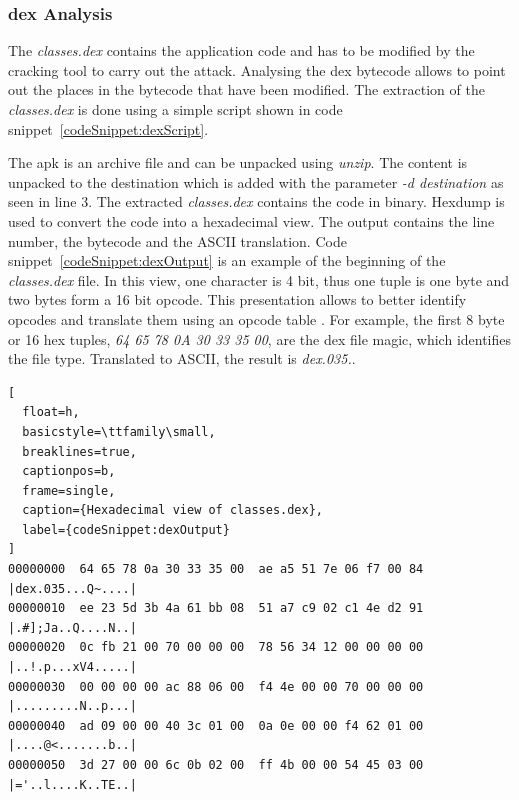 \subsubsection{dex Analysis} \label{subsection:tools-dex}
The \textit{classes.dex} contains the application code and has to be modified by the cracking tool to carry out the attack.
Analysing the dex bytecode allows to point out the places in the bytecode that have been modified.
\newline
The extraction of the \textit{classes.dex} is done using a simple script shown in code snippet~\ref{codeSnippet:dexScript}.
\newline

The \gls{apk} is an archive file and can be unpacked using \textit{unzip}.
The content is unpacked to the destination which is added with the parameter \textit{-d destination} as seen in line 3.
The extracted \textit{classes.dex} contains the code in binary.
Hexdump is used to convert the code into a hexadecimal view.
\newline
The output contains the line number, the bytecode and the ASCII translation.
Code snippet~\ref{codeSnippet:dexOutput} is an example of the beginning of the \textit{classes.dex} file.
In this view, one character is 4 bit, thus one tuple is one byte and two bytes form a 16 bit opcode.
This presentation allows to better identify opcodes and translate them using an opcode table \cite{opcodes}.
For example, the first 8 byte or 16 hex tuples, \textit{64 65 78 0A 30 33 35 00}, are the \gls{dex} file magic, which identifies the file type.
Translated to ASCII, the result is \textit{dex.035.}.
\begin{lstlisting}[
  float=h,
  basicstyle=\ttfamily\small,
  breaklines=true,
  captionpos=b,
  frame=single,
  caption={Hexadecimal view of classes.dex},
  label={codeSnippet:dexOutput}
]
00000000  64 65 78 0a 30 33 35 00  ae a5 51 7e 06 f7 00 84  |dex.035...Q~....|
00000010  ee 23 5d 3b 4a 61 bb 08  51 a7 c9 02 c1 4e d2 91  |.#];Ja..Q....N..|
00000020  0c fb 21 00 70 00 00 00  78 56 34 12 00 00 00 00  |..!.p...xV4.....|
00000030  00 00 00 00 ac 88 06 00  f4 4e 00 00 70 00 00 00  |.........N..p...|
00000040  ad 09 00 00 40 3c 01 00  0a 0e 00 00 f4 62 01 00  |....@<.......b..|
00000050  3d 27 00 00 6c 0b 02 00  ff 4b 00 00 54 45 03 00  |='..l....K..TE..|
\end{lstlisting}
\newline

